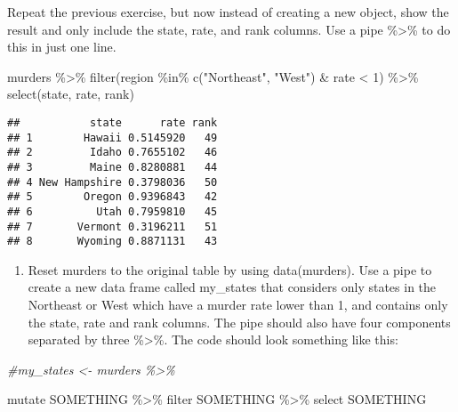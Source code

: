 \documentclass[
]{article}
\newenvironment{Shaded}{\begin{snugshade}}{\end{snugshade}}
\newcommand{\CommentTok}[1]{\textcolor[rgb]{0.56,0.35,0.01}{\textit{#1}}}
\newcommand{\DecValTok}[1]{\textcolor[rgb]{0.00,0.00,0.81}{#1}}
\newcommand{\FunctionTok}[1]{\textcolor[rgb]{0.00,0.00,0.00}{#1}}
\newcommand{\NormalTok}[1]{#1}
\newcommand{\SpecialCharTok}[1]{\textcolor[rgb]{0.00,0.00,0.00}{#1}}
\newcommand{\StringTok}[1]{\textcolor[rgb]{0.31,0.60,0.02}{#1}}
\providecommand{\tightlist}{%
  \setlength{\itemsep}{0pt}\setlength{\parskip}{0pt}}
\begin{document}
Repeat the previous exercise, but now instead of creating a new object,
show the result and only include the state, rate, and rank columns. Use
a pipe \%\textgreater\% to do this in just one line.

\begin{Shaded}
\begin{Highlighting}[]
\NormalTok{murders }\SpecialCharTok{\%\textgreater{}\%} \FunctionTok{filter}\NormalTok{(region }\SpecialCharTok{\%in\%} \FunctionTok{c}\NormalTok{(}\StringTok{"Northeast"}\NormalTok{, }\StringTok{"West"}\NormalTok{) }\SpecialCharTok{\&}\NormalTok{ rate }\SpecialCharTok{\textless{}} \DecValTok{1}\NormalTok{) }\SpecialCharTok{\%\textgreater{}\%} \FunctionTok{select}\NormalTok{(state, rate, rank)}
\end{Highlighting}
\end{Shaded}

\begin{verbatim}
##           state      rate rank
## 1        Hawaii 0.5145920   49
## 2         Idaho 0.7655102   46
## 3         Maine 0.8280881   44
## 4 New Hampshire 0.3798036   50
## 5        Oregon 0.9396843   42
## 6          Utah 0.7959810   45
## 7       Vermont 0.3196211   51
## 8       Wyoming 0.8871131   43
\end{verbatim}

\begin{enumerate}
\def\labelenumi{\arabic{enumi}.}
\setcounter{enumi}{1}
\tightlist
\item
  Reset murders to the original table by using data(murders). Use a pipe
  to create a new data frame called my\_states that considers only
  states in the Northeast or West which have a murder rate lower than 1,
  and contains only the state, rate and rank columns. The pipe should
  also have four components separated by three \%\textgreater\%. The
  code should look something like this:
\end{enumerate}

\begin{Shaded}
\begin{Highlighting}[]
\CommentTok{\#my\_states \textless{}{-} murders \%\textgreater{}\%}
\end{Highlighting}
\end{Shaded}

mutate SOMETHING \%\textgreater\% filter SOMETHING \%\textgreater\%
select SOMETHING
\end{document}
